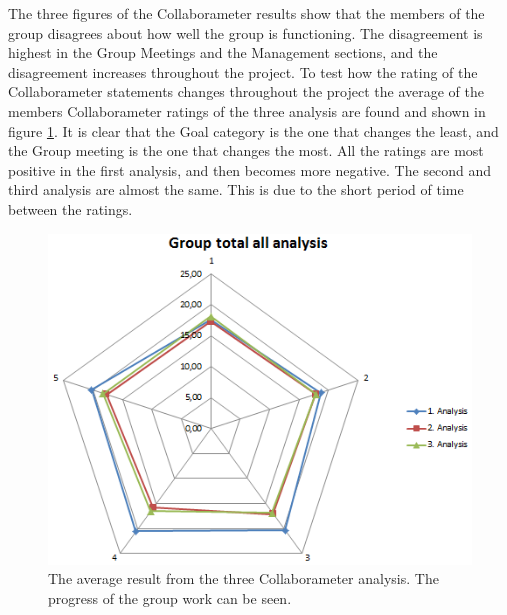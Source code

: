 The three figures of the Collaborameter results show that the members of the group disagrees about how well the group is functioning. The disagreement is highest in the Group Meetings and the Management sections, and the disagreement increases throughout the project. To test how the rating of the Collaborameter statements changes throughout the project the average of the members Collaborameter ratings of the three analysis are found and shown in figure \ref{fig:ALLanalysisCollaborameter}. It is clear that the Goal category is the one that changes the least, and the Group meeting is the one that changes the most. All the ratings are most positive in the first analysis, and then becomes more negative. The second and third analysis are almost the same. This is due to the short period of time between the ratings. 
\begin{figure}
\centering
\includegraphics[width=0.45\linewidth]{./graphics/ALLanalysisCollaborameter}
\caption[Average result of the Collaborameter results]{The average result from the three Collaborameter analysis. The progress of the group work can be seen.}
\label{fig:ALLanalysisCollaborameter}
\end{figure}


